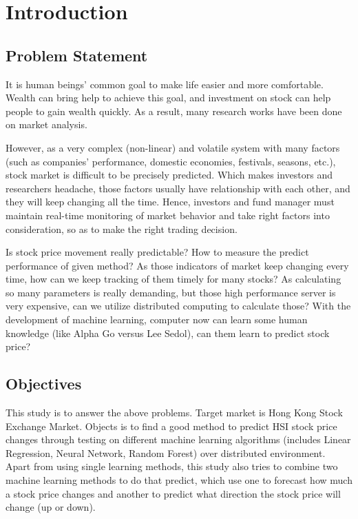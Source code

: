 \chapter{Introduction} 

\section{Problem Statement}

It is human beings' common goal to make life easier and more comfortable. Wealth can bring help to achieve this goal, and investment on stock can help people to gain wealth quickly. As a result, many research works have been done on market analysis.\par 

However, as a very complex (non-linear) and volatile system with many factors (such as companies' performance, domestic economies, festivals, seasons, etc.), stock market is difficult to be precisely predicted. Which makes investors and researchers headache, those factors usually have relationship with each other, and they will keep changing all the time. Hence, investors and fund manager must maintain real-time monitoring of market behavior and take right factors into consideration, so as to make the right trading decision.\par

Is stock price movement really predictable? How to measure the predict performance of given method? As those indicators of market keep changing every time, how can we keep tracking of them timely for many stocks? As calculating so many parameters is really demanding, but those high performance server is very expensive, can we utilize distributed computing to calculate those? With the development of machine learning, computer now can learn some human knowledge (like Alpha Go versus Lee Sedol), can them learn to predict stock price?

\section{Objectives}

This study is to answer the above problems. Target market is Hong Kong Stock Exchange Market. Objects is to find a good method to predict HSI stock price changes through testing on different machine learning algorithms (includes Linear Regression, Neural Network, Random Forest) over distributed environment. Apart from using single learning methods, this study also tries to combine two machine learning methods to do that predict, which use one to forecast how much a stock price changes and another to predict what direction the stock price will change (up or down). 


